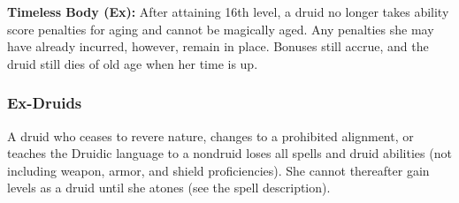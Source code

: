 \textbf{Timeless Body (Ex):} After attaining 16th level, a druid no longer takes ability score penalties for aging and cannot be magically aged. Any penalties she may have already incurred, however, remain in place. Bonuses still accrue, and the druid still dies of old age when her time is up.

\subsubsection{Ex-Druids}
A druid who ceases to revere nature, changes to a prohibited alignment, or teaches the Druidic language to a nondruid loses all spells and druid abilities (not including weapon, armor, and shield proficiencies). She cannot thereafter gain levels as a druid until she atones (see the  spell description).




